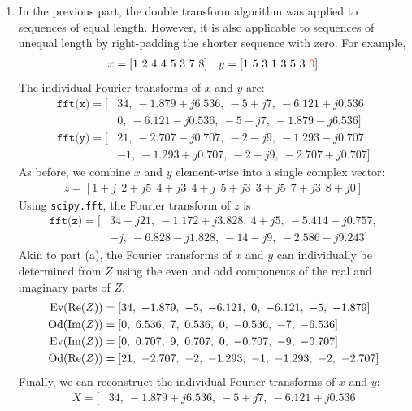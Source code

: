 \documentclass[a4paper, 11pt]{article}
\begin{document}
\begin{enumerate}[label=\alph*)]
    \item In the previous part, the double transform algorithm was applied to
    sequences of equal length. However, it is also applicable to sequences of
    unequal length by right-padding the shorter sequence with zero. For example,
    \begin{align*}
        x = [1\ 2\ 4\ 4\ 5\ 3\ 7\ 8] &&
        y = [1\ 5\ 3\ 1\ 3\ 5\ 3\ \textcolor{red}{0}]
    \end{align*}
    The individual Fourier transforms of $x$ and $y$ are:
    \begin{align*}
        \texttt{fft(x)} = [&34,\ -1.879+j6.536,\ -5+j7,\ -6.121+j0.536 \\
                           &0,\ -6.121-j0.536,\ -5-j7,\ -1.879-j6.536] \\
        \texttt{fft(y)} = [&21,\ -2.707-j0.707,\ -2-j9,\ -1.293-j0.707 \\
                           &-1,\ -1.293+j0.707,\ -2+j9,\ -2.707+j0.707]
    \end{align*}
    As before, we combine $x$ and $y$ element-wise into a single complex vector:
    \begin{align*}
        z = [1+j\ \ 2+j5\ \ 4+j3\ \ 4+j\ \ 5+j3\ \ 3+j5\ \ 7+j3\ \ 8+j0]
    \end{align*}
    Using \texttt{scipy.fft}, the Fourier transform of $z$ is
    \begin{align*}
        \texttt{fft(z)} = [&34+j21,\ -1.172+j3.828,\ 4+j5,\ -5.414-j0.757,\\
                           &-j,\ -6.828-j1.828,\ -14-j9,\ -2.586-j9.243]
    \end{align*}
    Akin to part (a), the Fourier transforms of $x$ and $y$ can individually be
    determined from $Z$ using the even and odd components of the real and
    imaginary parts of $Z$.
    \begin{align*}
        \Ev(\Re(Z)) &= [34,\ -1.879,\ -5,\ -6.121,\ 0,\ -6.121,\ -5,\ -1.879] \\
        \Od(\Im(Z)) &= [0,\ 6.536,\ 7,\ 0.536,\ 0,\ -0.536,\ -7,\ -6.536] \\
        \Ev(\Im(Z)) &= [0,\ 0.707,\ 9,\ 0.707,\ 0,\ -0.707,\ -9,\ -0.707] \\
        \Od(\Re(Z)) &= [21,\ -2.707,\ -2,\ -1.293,\ -1,\ -1.293,\ -2,\ -2.707]
    \end{align*}
    Finally, we can reconstruct the individual Fourier transforms of $x$ and
    $y$:
    \begin{align*}
        X = [&34,\ -1.879+j6.536,\ -5+j7,\ -6.121+j0.536 \\

\end{align*}
\end{enumerate}
\end{document}
